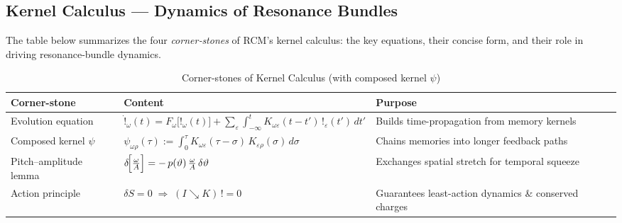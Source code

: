\subsection{Kernel Calculus — Dynamics of Resonance Bundles}
\medskip
The table below summarizes the four \emph{corner‐stones} of RCM’s kernel calculus: the key equations, their concise form, and their role in driving resonance‐bundle dynamics.

\begin{table}[H]
  \centering
  \small
  \caption{Corner-stones of Kernel Calculus (with composed kernel \(\psi\))}
  \label{tab:rcm-ch2-kernel-cornerstones}
  \renewcommand{\arraystretch}{1.25}
  \begin{tabular}{@{}p{} p{} p{}@{}}
    \toprule
    \textbf{Corner-stone}    & \textbf{Content}                                                                                                                  & \textbf{Purpose}                                  \\
    \midrule
    Evolution equation       & \(\displaystyle
      \dot{!}_{\omega}(t)
      = F_{\omega}\bigl[!_{\omega}(t)\bigr]
      + \sum_{\varepsilon}
        \int_{-\infty}^{t}
          K_{\omega\varepsilon}(t-t')\,
          !_{\varepsilon}(t')\,dt'
    \)                                                                                                              & Builds time-propagation from memory kernels      \\
    Composed kernel \(\psi\) & \(\displaystyle
      \psi_{\omega\rho}(\tau)
      := \int_{0}^{\tau}
          K_{\omega\varepsilon}(\tau-\sigma)\,
          K_{\varepsilon\rho}(\sigma)\,d\sigma
    \)                                                                                                              & Chains memories into longer feedback paths       \\
    Pitch–amplitude lemma    & \(\displaystyle
      \delta\!\Bigl[\tfrac{\omega}{A}\Bigr]
      = -\,p(\vartheta)\,\tfrac{\omega}{A}\,\delta\vartheta
    \)                                                                                                              & Exchanges spatial stretch for temporal squeeze   \\
    Action principle         & \(\displaystyle
      \delta S = 0
      \;\Longrightarrow\;
      (I \searrow K)\,! = 0
    \)                                                                                                              & Guarantees least-action dynamics \& conserved charges \\
    \bottomrule
  \end{tabular}
\end{table}

